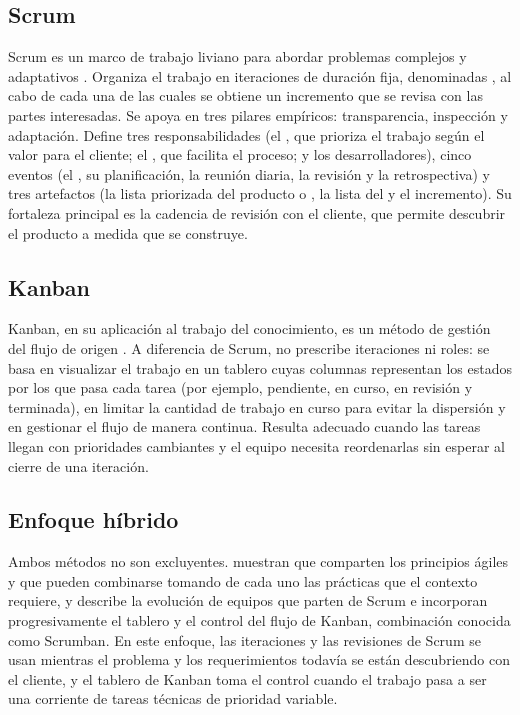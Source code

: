 \subsection{Scrum}\label{ssec:scrum}

Scrum es un marco de trabajo liviano para abordar problemas complejos y adaptativos \parencite{schwaber2020}. Organiza el trabajo en iteraciones de duración fija, denominadas , al cabo de cada una de las cuales se obtiene un incremento que se revisa con las partes interesadas. Se apoya en tres pilares empíricos: transparencia, inspección y adaptación. Define tres responsabilidades (el , que prioriza el trabajo según el valor para el cliente; el , que facilita el proceso; y los desarrolladores), cinco eventos (el , su planificación, la reunión diaria, la revisión y la retrospectiva) y tres artefactos (la lista priorizada del producto o , la lista del  y el incremento). Su fortaleza principal es la cadencia de revisión con el cliente, que permite descubrir el producto a medida que se construye.

\subsection{Kanban}\label{ssec:kanban}

Kanban, en su aplicación al trabajo del conocimiento, es un método de gestión del flujo de origen  \parencite{anderson2010}. A diferencia de Scrum, no prescribe iteraciones ni roles: se basa en visualizar el trabajo en un tablero cuyas columnas representan los estados por los que pasa cada tarea (por ejemplo, pendiente, en curso, en revisión y terminada), en limitar la cantidad de trabajo en curso para evitar la dispersión y en gestionar el flujo de manera continua. Resulta adecuado cuando las tareas llegan con prioridades cambiantes y el equipo necesita reordenarlas sin esperar al cierre de una iteración.

\subsection{Enfoque híbrido}\label{ssec:enfoque-hibrido}

Ambos métodos no son excluyentes. \textcite{kniberg2010} muestran que comparten los principios ágiles y que pueden combinarse tomando de cada uno las prácticas que el contexto requiere, y \textcite{ladas2009} describe la evolución de equipos que parten de Scrum e incorporan progresivamente el tablero y el control del flujo de Kanban, combinación conocida como Scrumban. En este enfoque, las iteraciones y las revisiones de Scrum se usan mientras el problema y los requerimientos todavía se están descubriendo con el cliente, y el tablero de Kanban toma el control cuando el trabajo pasa a ser una corriente de tareas técnicas de prioridad variable.

